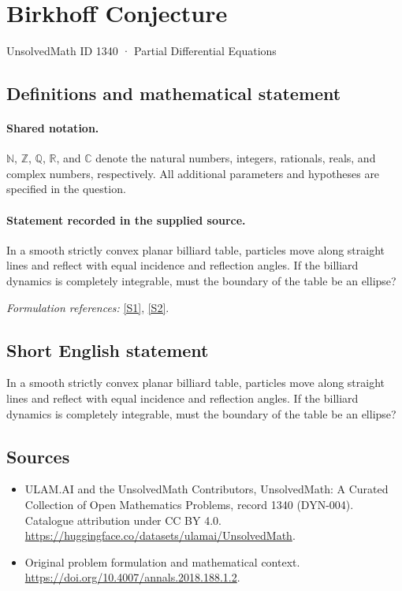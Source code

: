 \documentclass[11pt]{article}
\newcommand{\sref}[2]{\hyperlink{source:#1:#2}{[S#2]}}
\begin{document}
\setcounter{section}{1339}
\section{Birkhoff Conjecture}\label{1340}
{\small UnsolvedMath ID 1340 · Partial Differential Equations}
\subsection{Definitions and mathematical statement}

\paragraph{Shared notation.}$\mathbb N$, $\mathbb Z$, $\mathbb Q$, $\mathbb R$, and $\mathbb C$ denote the natural numbers, integers, rationals, reals, and complex numbers, respectively. All additional parameters and hypotheses are specified in the question.


\paragraph{Statement recorded in the supplied source.}
In a smooth strictly convex planar billiard table, particles move along straight lines and reflect with equal incidence and reflection angles. If the billiard dynamics is completely integrable, must the boundary of the table be an ellipse?
\par\smallskip\textit{Formulation references:} \sref{1340}{1}, \sref{1340}{2}.
\subsection{Short English statement}
In a smooth strictly convex planar billiard table, particles move along straight lines and reflect with equal incidence and reflection angles. If the billiard dynamics is completely integrable, must the boundary of the table be an ellipse?
\subsection{Sources}
\begin{itemize}
\item[\hypertarget{source:1340:1}{S1}] ULAM.AI and the UnsolvedMath Contributors, UnsolvedMath: A Curated Collection of Open Mathematics Problems, record 1340 (DYN-004). Catalogue attribution under CC BY 4.0.
\url{https://huggingface.co/datasets/ulamai/UnsolvedMath}.
\item[\hypertarget{source:1340:2}{S2}] Original problem formulation and mathematical context.
\url{https://doi.org/10.4007/annals.2018.188.1.2}.
\end{itemize}
\label{end:1340}
\end{document}
